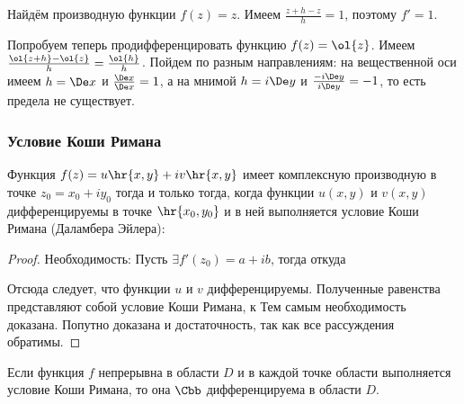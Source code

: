 \documentclass[a4paper]{article}
\begin{document}
\begin{ex}
Найдём производную функции $f(z) = z$. Имеем $\frac{z + h - z}{h} = 1$, поэтому $f' = 1$.
\end{ex}

\begin{ex}
Попробуем теперь продифференцировать функцию $f(z) = \ol{z}$.
Имеем $\frac{\ol{z + h} - \ol{z}}{h} = \frac{\ol{h}}{h}$. Пойдем по разным направлениям:
на вещественной оси имеем $h = \De x$ и $\frac{\De x}{\De x} = 1$, а на мнимой
$h = i\De y$ и $\frac{ - i\De y}{i\De y} = - 1$, то есть предела не существует.
\end{ex}

\subsubsection{Условие Коши Римана}

\begin{theorem}
Функция $f(z) = u\hr{x,y} + iv\hr{x,y}$ имеет комплексную производную в точке $z_0 = x_0 + iy_0$ тогда
и только тогда, когда функции $u(x,y)$ и $v(x,y)$ дифференцируемы в точке $\hr{x_0, y_0}$ и в ней выполняется условие
Коши Римана (Даламбера Эйлера):

\end{theorem}

\begin{proof}
Необходимость: Пусть $\exi f'(z_0 ) = a + i b$, тогда
откуда

Отсюда следует, что функции $u$ и $v$ дифференцируемы. Полученные равенства представляют собой условие Коши Римана, к
Тем самым необходимость доказана. Попутно доказана и достаточность, так как все рассуждения обратимы.
\end{proof}

\begin{theorem}
Если функция $f$ непрерывна в области $D$ и в каждой точке области выполняется условие
Коши Римана, то она $\Cbb$ дифференцируема в области $D$.
\end{theorem}
\end{document}
